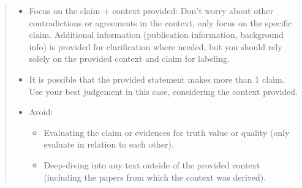 \begin{quote}
\begin{itemize}
\item Focus on the claim + context provided: Don't worry about other contradictions or agreements in the context, only focus on the specific claim. Additional information (publication information, background info) is provided for clarification where needed, but you should rely solely on the provided context and claim for labeling.
\item It is possible that the provided statement makes more than 1 claim. Use your best judgement in this case, considering the context provided.
\item Avoid:
    \begin{itemize}
        \item Evaluating the claim or evidences for truth value or quality (only evaluate in relation to each other).
        \item Deep-diving into any text outside of the provided context (including the papers from which the context was derived).
    \end{itemize}
\end{itemize}
\end{quote}


